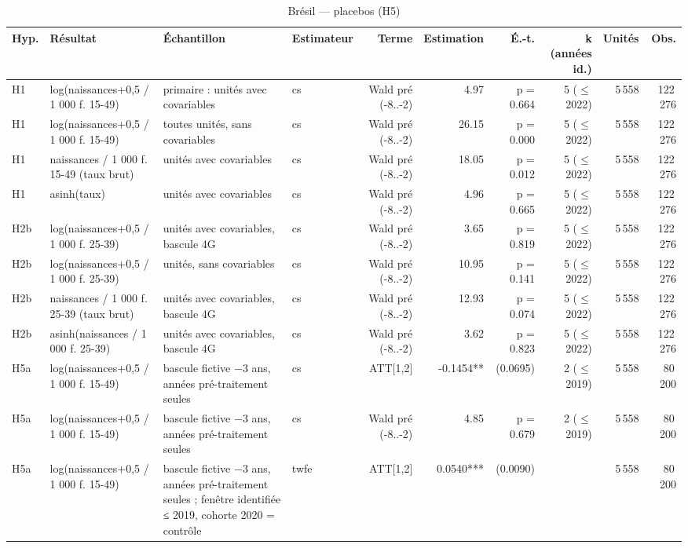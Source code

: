 \begin{table}\centering
\begin{threeparttable}
\caption{Brésil — placebos (H5)}\label{tab:br_placebo}
\scriptsize
\begin{tabular}{lp{4.3cm}p{7.0cm}lrrrrrr}
\toprule
Hyp. & Résultat & Échantillon & Estimateur & Terme & Estimation & É.-t. & k (années id.) & Unités & Obs. \\
\midrule
H1 & log(naissances+0,5 / 1 000 f. 15-49) & primaire : unités avec covariables & cs & Wald pré (-8..-2) & 4.97 & p = 0.664 & 5 ($\leq$ 2022) & 5\,558 & 122\,276 \\
H1 & log(naissances+0,5 / 1 000 f. 15-49) & toutes unités, sans covariables & cs & Wald pré (-8..-2) & 26.15 & p = 0.000 & 5 ($\leq$ 2022) & 5\,558 & 122\,276 \\
H1 & naissances / 1 000 f. 15-49 (taux brut) & unités avec covariables & cs & Wald pré (-8..-2) & 18.05 & p = 0.012 & 5 ($\leq$ 2022) & 5\,558 & 122\,276 \\
H1 & asinh(taux) & unités avec covariables & cs & Wald pré (-8..-2) & 4.96 & p = 0.665 & 5 ($\leq$ 2022) & 5\,558 & 122\,276 \\
H2b & log(naissances+0,5 / 1 000 f. 25-39) & unités avec covariables, bascule 4G & cs & Wald pré (-8..-2) & 3.65 & p = 0.819 & 5 ($\leq$ 2022) & 5\,558 & 122\,276 \\
H2b & log(naissances+0,5 / 1 000 f. 25-39) & unités, sans covariables & cs & Wald pré (-8..-2) & 10.95 & p = 0.141 & 5 ($\leq$ 2022) & 5\,558 & 122\,276 \\
H2b & naissances / 1 000 f. 25-39 (taux brut) & unités avec covariables, bascule 4G & cs & Wald pré (-8..-2) & 12.93 & p = 0.074 & 5 ($\leq$ 2022) & 5\,558 & 122\,276 \\
H2b & asinh(naissances / 1 000 f. 25-39) & unités avec covariables, bascule 4G & cs & Wald pré (-8..-2) & 3.62 & p = 0.823 & 5 ($\leq$ 2022) & 5\,558 & 122\,276 \\
H5a & log(naissances+0,5 / 1 000 f. 15-49) & bascule fictive $-$3 ans, années pré-traitement seules & cs & ATT[1,2] & -0.1454** & (0.0695) & 2 ($\leq$ 2019) & 5\,558 & 80\,200 \\
H5a & log(naissances+0,5 / 1 000 f. 15-49) & bascule fictive $-$3 ans, années pré-traitement seules & cs & Wald pré (-8..-2) & 4.85 & p = 0.679 & 2 ($\leq$ 2019) & 5\,558 & 80\,200 \\
H5a & log(naissances+0,5 / 1 000 f. 15-49) & bascule fictive $-$3 ans, années pré-traitement seules ; fenêtre identifiée ≤ 2019, cohorte 2020 = contrôle & twfe & ATT[1,2] & 0.0540*** & (0.0090) &  & 5\,558 & 80\,200 \\

\end{tabular}
\end{threeparttable}
\end{table}
